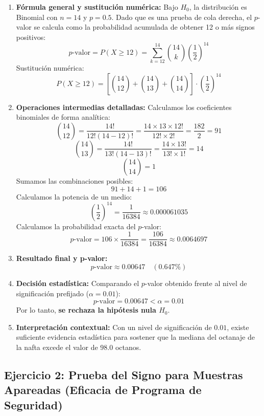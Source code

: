 \documentclass[11pt,a4paper]{article}
\begin{document}
\begin{enumerate}
    \item \textbf{Fórmula general y sustitución numérica:}
    Bajo $H_0$, la distribución es Binomial con $n=14$ y $p=0.5$. Dado que es una prueba de cola derecha, el $p$-valor se calcula como la probabilidad acumulada de obtener 12 o más signos positivos:
    \[ p\text{-valor} = P(X \ge 12) = \sum_{k=12}^{14} \binom{14}{k} \left(\frac{1}{2}\right)^{14} \]
    Sustitución numérica:
    \[ P(X \ge 12) = \left[ \binom{14}{12} + \binom{14}{13} + \binom{14}{14} \right] \cdot \left(\frac{1}{2}\right)^{14} \]

    \item \textbf{Operaciones intermedias detalladas:}
    Calculamos los coeficientes binomiales de forma analítica:
    \[ \binom{14}{12} = \frac{14!}{12!(14-12)!} = \frac{14 \times 13 \times 12!}{12! \times 2!} = \frac{182}{2} = 91 \]
    \[ \binom{14}{13} = \frac{14!}{13!(14-13)!} = \frac{14 \times 13!}{13! \times 1!} = 14 \]
    \[ \binom{14}{14} = 1 \]
    Sumamos las combinaciones posibles:
    \[ 91 + 14 + 1 = 106 \]
    Calculamos la potencia de un medio:
    \[ \left(\frac{1}{2}\right)^{14} = \frac{1}{16384} \approx 0.000061035 \]
    Calculamos la probabilidad exacta del $p$-valor:
    \[ p\text{-valor} = 106 \times \frac{1}{16384} = \frac{106}{16384} \approx 0.0064697 \]

    \item \textbf{Resultado final y p-valor:}
    \[ p\text{-valor} \approx 0.00647 \quad (0.647\%) \]

    \item \textbf{Decisión estadística:}
    Comparando el $p$-valor obtenido frente al nivel de significación prefijado ($\alpha = 0.01$):
    \[ p\text{-valor} = 0.00647 < \alpha = 0.01 \]
    Por lo tanto, \textbf{se rechaza la hipótesis nula $H_0$}.

    \item \textbf{Interpretación contextual:}
    Con un nivel de significación de $0.01$, existe suficiente evidencia estadística para sostener que la mediana del octanaje de la nafta excede el valor de $98.0$ octanos.

\end{enumerate}

\newpage
\subsection{Ejercicio 2: Prueba del Signo para Muestras Apareadas (Eficacia de Programa de Seguridad)} \label{ej:signo_ap}
\end{document}
